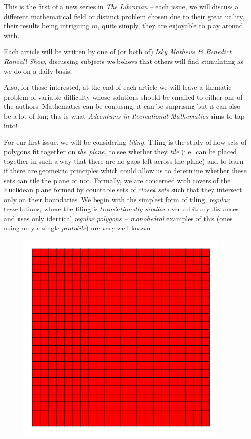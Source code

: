 This is the first of a new series in \emph{The Librarian} -- each issue,
we will discuss a different mathematical field or distinct problem
chosen due to their great utility, their results being intriguing or,
quite simply, they are enjoyable to play around with.

Each article will be written by one of (or both of) \emph{Isky Mathews
\& Benedict Randall Shaw}, discussing subjects we believe that others
will find stimulating as we do on a daily basis.

Also, for those interested, at the end of each article we will leave a
thematic problem of variable difficulty whose solutions should be
emailed to either one of the authors. Mathematics can be confusing, it
can be surprising but it can also be a lot of fun; this is what
\emph{Adventures in Recreational Mathematics} aims to tap into!

For our first issue, we will be considering \emph{tiling.} Tiling is the
study of how sets of polygons fit together on \emph{the plane,} to see
whether they \emph{tile} (i.e.~can be placed together in such a way that
there are no gaps left across the plane) and to learn if there are
geometric principles which could allow us to determine whether these
sets can tile the plane or not. Formally, we are concerned with covers
of the Euclidean plane formed by countable sets of \emph{closed sets}
such that they intersect only on their boundaries. We begin with the
simplest form of tiling, \emph{regular} tessellations, where the tiling
is \emph{translationally similar} over arbitrary distances and uses only
identical \emph{regular polygons -- monohedral} examples of this (ones
using only a single \emph{prototile}) are very well known.

\begin{figure}[htbp]
\centering
\includegraphics{image_0.png}
\caption{}
\end{figure}

